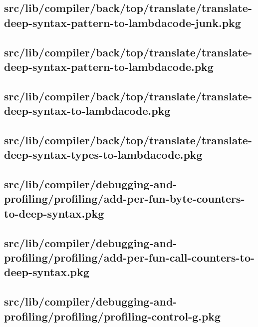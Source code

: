\subsection{src/lib/compiler/back/top/translate/translate-deep-syntax-pattern-to-lambdacode-junk.pkg}


\subsection{src/lib/compiler/back/top/translate/translate-deep-syntax-pattern-to-lambdacode.pkg}


\subsection{src/lib/compiler/back/top/translate/translate-deep-syntax-to-lambdacode.pkg}


\subsection{src/lib/compiler/back/top/translate/translate-deep-syntax-types-to-lambdacode.pkg}


\subsection{src/lib/compiler/debugging-and-profiling/profiling/add-per-fun-byte-counters-to-deep-syntax.pkg}


\subsection{src/lib/compiler/debugging-and-profiling/profiling/add-per-fun-call-counters-to-deep-syntax.pkg}


\subsection{src/lib/compiler/debugging-and-profiling/profiling/profiling-control-g.pkg}


